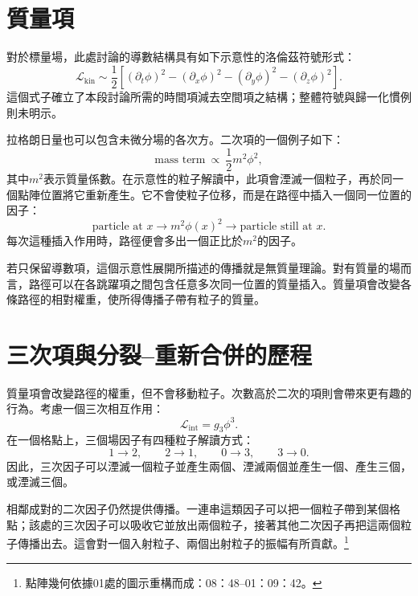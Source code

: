 \section{質量項}

對於標量場，此處討論的導數結構具有如下示意性的洛倫茲符號形式：
\begin{equation}
\mathcal{L}_{\mathrm{kin}}
\sim
\frac{1}{2}\left[
(\partial_t\phi)^2
-(\partial_x\phi)^2
-(\partial_y\phi)^2
-(\partial_z\phi)^2
\right].
\end{equation}
這個式子確立了本段討論所需的時間項減去空間項之結構；整體符號與歸一化慣例則未明示。

拉格朗日量也可以包含未微分場的各次方。二次項的一個例子如下：
\begin{equation}
\text{mass term}\ \propto\ \frac{1}{2}m^2\phi^2,
\end{equation}
其中\(m^2\)表示質量係數。在示意性的粒子解讀中，此項會湮滅一個粒子，再於同一個點陣位置將它重新產生。它不會使粒子位移，而是在路徑中插入一個同一位置的因子：
\begin{equation}
\text{particle at }x
\longrightarrow
\boxed{m^2\phi(x)^2}
\longrightarrow
\text{particle still at }x.
\end{equation}
每次這種插入作用時，路徑便會多出一個正比於\(m^2\)的因子。

若只保留導數項，這個示意性展開所描述的傳播就是無質量理論。對有質量的場而言，路徑可以在各跳躍項之間包含任意多次同一位置的質量插入。質量項會改變各條路徑的相對權重，使所得傳播子帶有粒子的質量。

\section{三次項與分裂--重新合併的歷程}

質量項會改變路徑的權重，但不會移動粒子。次數高於二次的項則會帶來更有趣的行為。考慮一個三次相互作用：
\begin{equation}
\mathcal{L}_{\mathrm{int}}=g_3\phi^3.
\end{equation}
在一個格點上，三個場因子有四種粒子解讀方式：
\begin{equation}
1\longrightarrow 2,
\qquad
2\longrightarrow 1,
\qquad
0\longrightarrow 3,
\qquad
3\longrightarrow 0.
\end{equation}
因此，三次因子可以湮滅一個粒子並產生兩個、湮滅兩個並產生一個、產生三個，或湮滅三個。

相鄰成對的二次因子仍然提供傳播。一連串這類因子可以把一個粒子帶到某個格點；該處的三次因子可以吸收它並放出兩個粒子，接著其他二次因子再把這兩個粒子傳播出去。這會對一個入射粒子、兩個出射粒子的振幅有所貢獻。\footnote{點陣幾何依據01處的圖示重構而成：08：48--01：09：42。}

